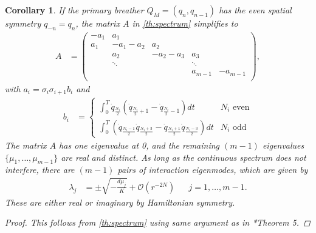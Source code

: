 \documentclass[12pt,reqno]{amsart}
\newtheorem{corollary}{Corollary}
\theoremstyle{definition}
\begin{document}
\begin{corollary}\label{corr:even}
If the primary breather $Q_M = (q_n, q_{n-1})$ has the even spatial symmetry $q_{-n} = q_n$, the matrix $A$ in \cref{th:spectrum} simplifies to
\begin{align}\label{eq:matrixAsymm}
A &= \begin{pmatrix}
-a_1 & a_1 & & & \\
a_1 & -a_1 - a_2 & a_2 \\
& a_2 & -a_2 - a_3 & a_3 \\
& \ddots & & \ddots \\
& & & a_{m-1} & -a_{m-1}  \\
\end{pmatrix},
\end{align}
with $a_i = \sigma_i \sigma_{i+1} b_i$ and
\begin{align*}
b_i &= \begin{cases}
\int_0^T \dot{q}_{\frac{N_i}{2}}\left( \dot{q}_{\frac{N_i}{2}+1} - \dot{q}_{\frac{N_i}{2}-1}\right) dt & N_i \text{ even} \\
\int_0^T \left( \dot{q}_{\frac{N_i-1}{2}}\dot{q}_{\frac{N_i+3}{2}} - \dot{q}_{\frac{N_i+1}{2}}\dot{q}_{\frac{N_i-3}{2}} \right) dt & N_i \text{ odd}
\end{cases}
\end{align*}
The matrix $A$ has one eigenvalue at 0, and the remaining $(m-1)$ eigenvalues $\{\mu_1, \dots, \mu_{m-1}\}$ are real and distinct. As long as the continuous spectrum does not interfere, there are $(m-1)$ pairs of interaction eigenmodes, which are given by 
\begin{align}\label{eq:inteigs}
\lambda_j &= \pm \sqrt{-\frac{d \mu_j}{K}} + \mathcal{O}(r^{-2N}) && j = 1, \dots, m-1.
\end{align}
These are either real or imaginary by Hamiltonian symmetry.
\begin{proof}
This follows from \cref{th:spectrum} using same argument as in \cite{Parker2020}*{Theorem 5}.
\end{proof}
\end{corollary}
\end{document}
